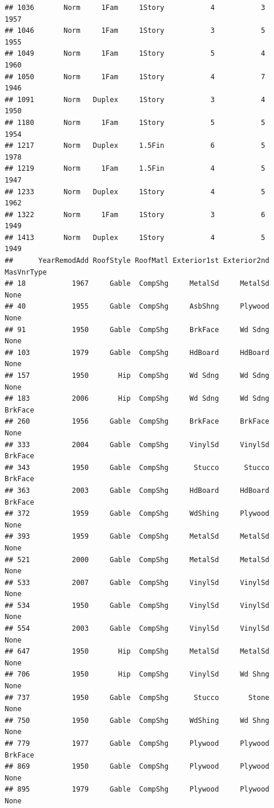 \documentclass[]{article}
\begin{document}
\begin{verbatim}
## 1036       Norm     1Fam     1Story           4           3      1957
## 1046       Norm     1Fam     1Story           3           5      1955
## 1049       Norm     1Fam     1Story           5           4      1960
## 1050       Norm     1Fam     1Story           4           7      1946
## 1091       Norm   Duplex     1Story           3           4      1950
## 1180       Norm     1Fam     1Story           5           5      1954
## 1217       Norm   Duplex     1.5Fin           6           5      1978
## 1219       Norm     1Fam     1.5Fin           4           5      1947
## 1233       Norm   Duplex     1Story           4           5      1962
## 1322       Norm     1Fam     1Story           3           6      1949
## 1413       Norm   Duplex     1Story           4           5      1949
##      YearRemodAdd RoofStyle RoofMatl Exterior1st Exterior2nd MasVnrType
## 18           1967     Gable  CompShg     MetalSd     MetalSd       None
## 40           1955     Gable  CompShg     AsbShng     Plywood       None
## 91           1950     Gable  CompShg     BrkFace     Wd Sdng       None
## 103          1979     Gable  CompShg     HdBoard     HdBoard       None
## 157          1950       Hip  CompShg     Wd Sdng     Wd Sdng       None
## 183          2006       Hip  CompShg     Wd Sdng     Wd Sdng    BrkFace
## 260          1956     Gable  CompShg     BrkFace     BrkFace       None
## 333          2004     Gable  CompShg     VinylSd     VinylSd    BrkFace
## 343          1950     Gable  CompShg      Stucco      Stucco    BrkFace
## 363          2003     Gable  CompShg     HdBoard     HdBoard    BrkFace
## 372          1959     Gable  CompShg     WdShing     Plywood       None
## 393          1959     Gable  CompShg     MetalSd     MetalSd       None
## 521          2000     Gable  CompShg     MetalSd     MetalSd       None
## 533          2007     Gable  CompShg     VinylSd     VinylSd       None
## 534          1950     Gable  CompShg     VinylSd     VinylSd       None
## 554          2003     Gable  CompShg     VinylSd     VinylSd       None
## 647          1950       Hip  CompShg     MetalSd     MetalSd       None
## 706          1950       Hip  CompShg     VinylSd     Wd Shng       None
## 737          1950     Gable  CompShg      Stucco       Stone       None
## 750          1950     Gable  CompShg     WdShing     Wd Shng       None
## 779          1977     Gable  CompShg     Plywood     Plywood    BrkFace
## 869          1950     Gable  CompShg     Plywood     Plywood       None
## 895          1979     Gable  CompShg     Plywood     Plywood       None

\end{verbatim}
\end{document}
